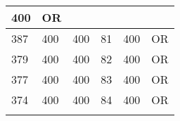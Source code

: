 \begin{table}[]
\begin{tabular}{lllll|l|}
400                                & OR                                    \\ \hline
387                                 & 400                                & 400                                & 81                                 & 
400                                & OR                                    \\ \hline
379                                 & 400                                & 400                                & 82                                 & 
400                                & OR                                    \\ \hline
377                                 & 400                                & 400                                & 83                                 & 
400                                & OR                                    \\ \hline
374                                 & 400                                & 400                                & 84                                 & 
400                                & OR                                    \\ \hline
                                    &                                    &                                    &                                    &   
                                 &                                       \\ \hline
\end{tabular}
\end{table}
